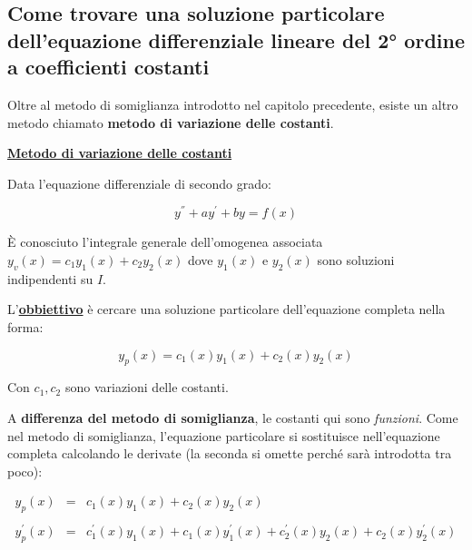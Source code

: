 \documentclass[a4paper]{article}
\begin{document}
	\subsection{Come trovare una soluzione particolare dell'equazione differenziale lineare del 2° ordine a coefficienti costanti}
	
	Oltre al metodo di somiglianza introdotto nel capitolo precedente, esiste un altro metodo chiamato \textbf{metodo di variazione delle costanti}.
	
	\noindent
	\textcolor{Red3}{\textbf{\underline{Metodo di variazione delle costanti}}}\newline
	
	\noindent
	Data l'equazione differenziale di secondo grado:
	
	\begin{equation*}
		y^{''} + ay^{'} + by = f\left(x\right)
	\end{equation*}

	\noindent
	È conosciuto l'integrale generale dell'omogenea associata $y_{v}\left(x\right) = c_{1}y_{1}\left(x\right) + c_{2}y_{2}\left(x\right)$ dove $y_{1}\left(x\right)$ e $y_{2}\left(x\right)$ sono soluzioni indipendenti su $I$.
	
	\noindent
	L'\textcolor{Red3}{\textbf{\underline{obbiettivo}}} è cercare una soluzione particolare dell'equazione completa nella forma:
	
	\begin{equation*}
		y_{p}\left(x\right) = c_{1}\left(x\right)y_{1}\left(x\right) + c_{2}\left(x\right)y_{2}\left(x\right)
	\end{equation*}

	\noindent
	Con $c_{1}, c_{2}$ sono variazioni delle costanti.\newline
	
	\noindent
	A \textbf{differenza del metodo di somiglianza}, le costanti qui sono \emph{funzioni}. Come nel metodo di somiglianza, l'equazione particolare si sostituisce nell'equazione completa calcolando le derivate (la seconda si omette perché sarà introdotta tra poco):
	
	\begin{equation*}
		\begin{array}{lll}
			y_{p}\left(x\right)		& = & c_{1}\left(x\right)y_{1}\left(x\right) + c_{2}\left(x\right)y_{2}\left(x\right) \\
			&& \\
			y_{p}^{'}\left(x\right) & = & c_{1}^{'}\left(x\right)y_{1}\left(x\right) + c_{1}\left(x\right)y_{1}^{'}\left(x\right) + c_{2}^{'}\left(x\right)y_{2}\left(x\right) + c_{2}\left(x\right)y_{2}^{'}\left(x\right)
		\end{array}
	\end{equation*}
\end{document}
